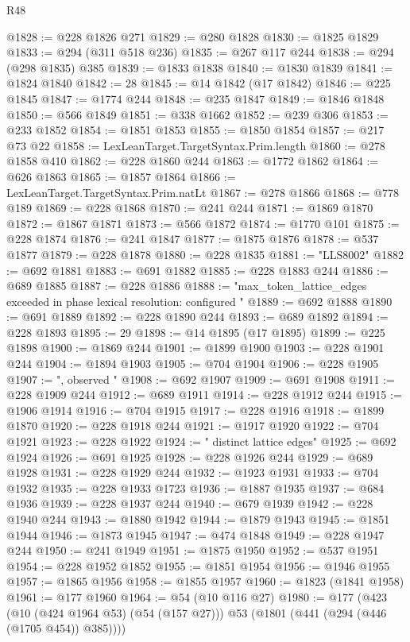 \begin{lexlean}{R48}
\begin{coremodule}
@1828 := @228 @1826 @271
@1829 := @280 @1828
@1830 := @1825 @1829
@1833 := @294 (@311 @518 @236)
@1835 := @267 @117 @244
@1838 := @294 (@298 @1835) @385
@1839 := @1833 @1838
@1840 := @1830 @1839
@1841 := @1824 @1840
@1842 := 28
@1845 := @14 @1842 (@17 @1842)
@1846 := @225 @1845
@1847 := @1774 @244
@1848 := @235 @1847
@1849 := @1846 @1848
@1850 := @566 @1849
@1851 := @338 @1662
@1852 := @239 @306
@1853 := @233 @1852
@1854 := @1851 @1853
@1855 := @1850 @1854
@1857 := @217 @73 @22
@1858 := LexLeanTarget.TargetSyntax.Prim.length
@1860 := @278 @1858 @410
@1862 := @228 @1860 @244
@1863 := @1772 @1862
@1864 := @626 @1863
@1865 := @1857 @1864
@1866 := LexLeanTarget.TargetSyntax.Prim.natLt
@1867 := @278 @1866
@1868 := @778 @189
@1869 := @228 @1868
@1870 := @241 @244
@1871 := @1869 @1870
@1872 := @1867 @1871
@1873 := @566 @1872
@1874 := @1770 @101
@1875 := @228 @1874
@1876 := @241 @1847
@1877 := @1875 @1876
@1878 := @537 @1877
@1879 := @228 @1878
@1880 := @228 @1835
@1881 := "LLS8002"
@1882 := @692 @1881
@1883 := @691 @1882
@1885 := @228 @1883 @244
@1886 := @689 @1885
@1887 := @228 @1886
@1888 := "max_token_lattice_edges exceeded in phase lexical resolution: configured "
@1889 := @692 @1888
@1890 := @691 @1889
@1892 := @228 @1890 @244
@1893 := @689 @1892
@1894 := @228 @1893
@1895 := 29
@1898 := @14 @1895 (@17 @1895)
@1899 := @225 @1898
@1900 := @1869 @244
@1901 := @1899 @1900
@1903 := @228 @1901 @244
@1904 := @1894 @1903
@1905 := @704 @1904
@1906 := @228 @1905
@1907 := ", observed "
@1908 := @692 @1907
@1909 := @691 @1908
@1911 := @228 @1909 @244
@1912 := @689 @1911
@1914 := @228 @1912 @244
@1915 := @1906 @1914
@1916 := @704 @1915
@1917 := @228 @1916
@1918 := @1899 @1870
@1920 := @228 @1918 @244
@1921 := @1917 @1920
@1922 := @704 @1921
@1923 := @228 @1922
@1924 := " distinct lattice edges"
@1925 := @692 @1924
@1926 := @691 @1925
@1928 := @228 @1926 @244
@1929 := @689 @1928
@1931 := @228 @1929 @244
@1932 := @1923 @1931
@1933 := @704 @1932
@1935 := @228 @1933 @1723
@1936 := @1887 @1935
@1937 := @684 @1936
@1939 := @228 @1937 @244
@1940 := @679 @1939
@1942 := @228 @1940 @244
@1943 := @1880 @1942
@1944 := @1879 @1943
@1945 := @1851 @1944
@1946 := @1873 @1945
@1947 := @474 @1848
@1949 := @228 @1947 @244
@1950 := @241 @1949
@1951 := @1875 @1950
@1952 := @537 @1951
@1954 := @228 @1952 @1852
@1955 := @1851 @1954
@1956 := @1946 @1955
@1957 := @1865 @1956
@1958 := @1855 @1957
@1960 := @1823 (@1841 @1958)
@1961 := @177 @1960
@1964 := @54 (@10 @116 @27)
@1980 := @177
    (@423
      (@10 (@424 @1964 @53) (@54 (@157 @27)))
      @53
      (@1801 (@441 (@294 (@446 (@1705 @454)) @385))))

\end{coremodule}
\end{lexlean}

